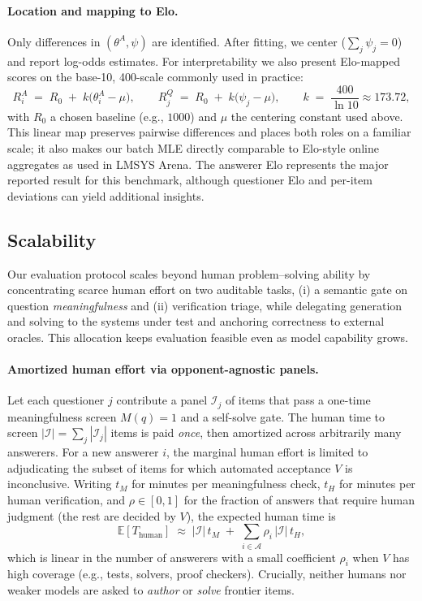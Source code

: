 \documentclass{article} %
\begin{document}
\paragraph{Location and mapping to Elo.}
Only differences in $(\theta^A,\psi)$ are identified. After fitting, we center ($\sum_j\psi_j=0$) and report log-odds estimates. For interpretability we also present Elo-mapped scores on the base-10, 400-scale commonly used in practice:
\begin{equation}
R^{A}_i \;=\; R_0 \;+\; k\big(\theta^A_i - \mu\big),
\qquad
R^{Q}_j \;=\; R_0 \;+\; k\big(\psi_j - \mu\big),
\qquad
k \;=\; \frac{400}{\ln 10}\approx 173.72,
\end{equation}
with $R_0$ a chosen baseline (e.g., $1000$) and $\mu$ the centering constant used above. This linear map preserves pairwise differences and places both roles on a familiar scale; it also makes our batch MLE directly comparable to Elo-style online aggregates as used in LMSYS Arena. The answerer Elo represents the major reported result for this benchmark, although questioner Elo and per-item deviations can yield additional insights.

\subsection{Scalability}
\label{sec:scalability}

Our evaluation protocol scales beyond human problem–solving ability by concentrating scarce human effort on two auditable tasks, (i) a semantic gate on question \emph{meaningfulness} and (ii) verification triage, while delegating generation and solving to the systems under test and anchoring correctness to external oracles. This allocation keeps evaluation feasible even as model capability grows.

\paragraph{Amortized human effort via opponent-agnostic panels.}
Let each questioner $j$ contribute a panel $\mathcal I_j$ of items that pass a one-time meaningfulness screen $M(q)=1$ and a self-solve gate. The human time to screen $|\mathcal I|=\sum_j |\mathcal I_j|$ items is paid \emph{once}, then amortized across arbitrarily many answerers. For a new answerer $i$, the marginal human effort is limited to adjudicating the subset of items for which automated acceptance $V$ is inconclusive. Writing $t_M$ for minutes per meaningfulness check, $t_H$ for minutes per human verification, and $\rho\in[0,1]$ for the fraction of answers that require human judgment (the rest are decided by $V$), the expected human time is
\begin{equation}
\mathbb E[T_{\text{human}}] \;\approx\; |\mathcal I|\, t_M \;+\; \sum_{i\in\mathcal A} \rho_i\,|\mathcal I|\, t_H,
\end{equation}
which is linear in the number of answerers with a small coefficient $\rho_i$ when $V$ has high coverage (e.g., tests, solvers, proof checkers). Crucially, neither humans nor weaker models are asked to \emph{author} or \emph{solve} frontier items.
\end{document}

